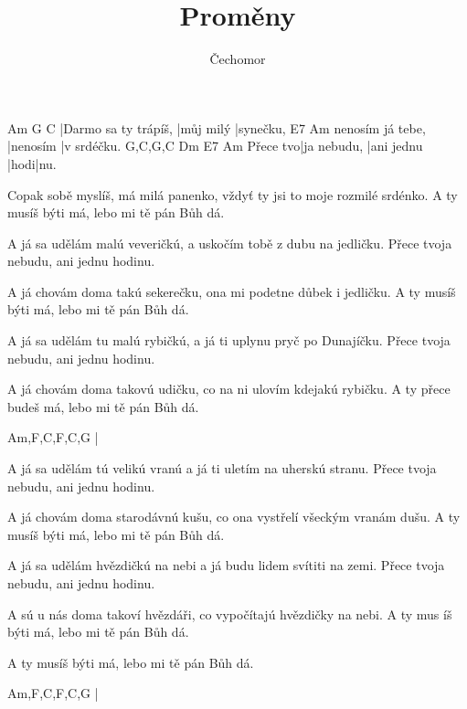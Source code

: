 \documentclass{song}
\title{Proměny}
\author{Čechomor}
\begin{document}
\begin{multicols}{2}

\strophe
Am                   G         C
|Darmo sa ty trápíš, |můj milý |synečku,
                 E7       Am
nenosím já tebe, |nenosím |v srdéčku.
         G,C,G,C     Dm         E7   Am
Přece tvo|ja nebudu, |ani jednu |hodi|nu.
\endstrophe

\strophe*
Copak sobě myslíš, má milá panenko,
vždyť ty jsi to moje rozmilé srdénko.
A ty musíš býti má, lebo mi tě pán Bůh dá.
\endstrophe

\strophe*
A já sa udělám malú veveričkú,
a uskočím tobě z dubu na jedličku.
Přece tvoja nebudu, ani jednu hodinu.
\endstrophe

\strophe*
A já chovám doma takú sekerečku,
ona mi podetne důbek i jedličku.
A ty musíš býti má, lebo mi tě pán Bůh dá.
\endstrophe

\strophe*
A já sa udělám tu malú rybičkú,
a já ti uplynu pryč po Dunajíčku.
Přece tvoja nebudu, ani jednu hodinu.
\endstrophe

\strophe*
A já chovám doma takovú udičku,
co na ni ulovím kdejakú rybičku.
A ty přece budeš má, lebo mi tě pán Bůh dá.
\endstrophe

\strophe
Am,F,C,F,C,G
|
\endstrophe

\columnbreak

\strophe*
A já sa udělám tú velikú vranú
a já ti uletím na uherskú stranu.
Přece tvoja nebudu, ani jednu hodinu.
\endstrophe

\strophe*
A já chovám doma starodávnú kušu,
co ona vystřelí všeckým vranám dušu.
A ty musíš býti má, lebo mi tě pán Bůh dá.
\endstrophe

\strophe*
A já sa udělám hvězdičkú na nebi
a já budu lidem svítiti na zemi.
Přece tvoja nebudu, ani jednu hodinu.
\endstrophe

\strophe*
A sú u nás doma takoví hvězdáři,
co vypočítajú hvězdičky na nebi.
A ty mus íš býti má, lebo mi tě pán Bůh dá.
\endstrophe

\strophe*
A ty musíš býti má, lebo mi tě pán Bůh dá.
\endstrophe

\strophe
Am,F,C,F,C,G
|
\endstrophe

\end{multicols}
\end{document}
